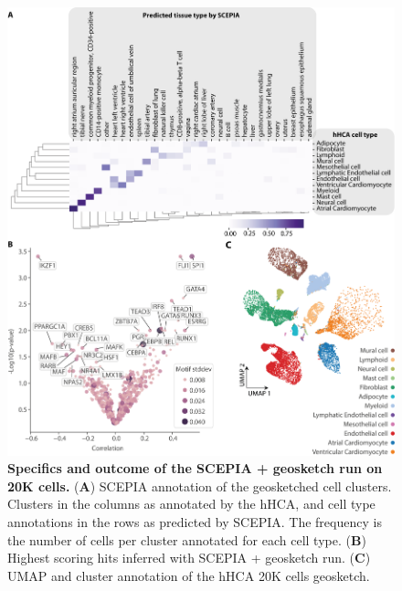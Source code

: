 \begin{figure}
    \centering
    \includegraphics[width=\linewidth]{ch.scepia/imgs/SCEPIAGEOSKETCH_AllCells20000_Myriad_v3_SuppfigGeoAnno.png}
    \caption{\textbf{Specifics and outcome of the SCEPIA + geosketch run on 20K cells.} (\textbf{A}) SCEPIA annotation of the geosketched cell clusters. Clusters in the columns as annotated by the hHCA, and cell type annotations in the rows as predicted by SCEPIA. The frequency is the number of cells per cluster annotated for each cell type. (\textbf{B}) Highest scoring hits inferred with SCEPIA + geosketch run. (\textbf{C}) UMAP and cluster annotation of the hHCA 20K cells geosketch. }
    \label{fig:geoscepia_results}
\end{figure}

